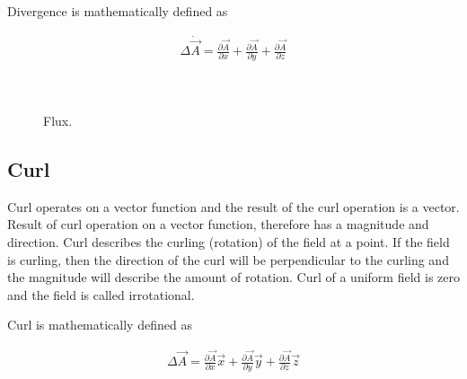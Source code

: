 Divergence is mathematically defined as

\begin{eqnarray}
\Delta \dot \vec{A} = \frac{\partial \vec{A}}{\partial x}  +\frac{\partial \vec{A}}{\partial y} +\frac{\partial \vec{A}}{\partial z} \\ \nonumber
\end{eqnarray}




\begin{figure}[htbp]
\begin{center}
\strut{} \\
\end{center}
\caption{Flux.}
\label{flux}
\end{figure}



\subsection{Curl}




Curl operates on a vector function and the result of the curl operation is a vector. Result of curl operation on  a vector function, therefore has a magnitude and direction. Curl describes the curling (rotation) of the field at a point. If the field is curling, then the direction of the curl will be perpendicular to the curling and the magnitude will describe the amount of rotation. Curl of a uniform field is zero and the field is called irrotational.


Curl is mathematically defined as

\begin{eqnarray}
\Delta \vec{A} = \frac{\partial \vec{A}}{\partial x} \vec{x} +\frac{\partial \vec{A}}{\partial y} \vec{y} +\frac{\partial \vec{A}}{\partial z} \vec{z} \\ \nonumber
\end{eqnarray}







